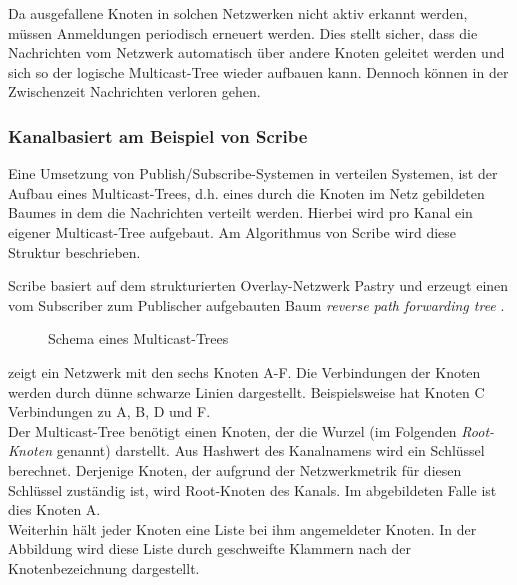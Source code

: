 Da ausgefallene Knoten in solchen Netzwerken nicht aktiv erkannt werden, müssen Anmeldungen periodisch erneuert werden. Dies stellt sicher, dass die Nachrichten vom Netzwerk automatisch über andere Knoten geleitet werden und sich so der logische Multicast-Tree wieder aufbauen kann. Dennoch können in der Zwischenzeit Nachrichten verloren gehen.

\subsubsection*{Kanalbasiert am Beispiel von Scribe}
\label{chap:related:scribe}
Eine Umsetzung von Publish/Subscribe-Systemen in verteilen Systemen, ist der Aufbau eines Multicast-Trees, d.h. eines durch die Knoten im Netz gebildeten Baumes in dem die Nachrichten verteilt werden. Hierbei wird pro Kanal ein eigener Multicast-Tree aufgebaut. Am Algorithmus von Scribe wird diese Struktur beschrieben.

Scribe basiert auf dem strukturierten Overlay-Netzwerk Pastry \cite{Rowstron2001} und erzeugt einen vom Subscriber zum Publischer aufgebauten Baum \emph{reverse path forwarding tree} \cite{Dalal1978}.

\begin{figure}[htbp]
\centering
{}
\caption{Schema eines Multicast-Trees}
\label{fig:multicast_tree}
\end{figure}

 zeigt ein Netzwerk mit den sechs Knoten A-F. Die Verbindungen der Knoten werden durch dünne schwarze Linien dargestellt. Beispielsweise hat Knoten C Verbindungen zu A, B, D und F.\\
Der Multicast-Tree benötigt einen Knoten, der die Wurzel (im Folgenden \emph{Root-Knoten} genannt) darstellt. Aus Hashwert des Kanalnamens wird ein Schlüssel berechnet. Derjenige Knoten, der aufgrund der Netzwerkmetrik für diesen Schlüssel zuständig ist, wird Root-Knoten des Kanals. Im abgebildeten Falle ist dies Knoten A.\\
Weiterhin hält jeder Knoten eine Liste bei ihm angemeldeter Knoten. In der Abbildung wird diese Liste durch geschweifte Klammern nach der Knotenbezeichnung dargestellt.

